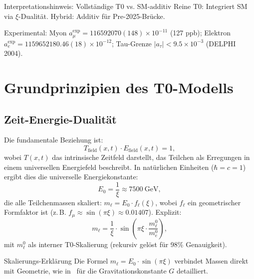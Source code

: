 \documentclass[12pt,a4paper]{article}
\theoremstyle{definition}
\begin{document}
	\begin{interpretation}{Interpretationshinweis: Vollständige T0 vs. SM-additiv}
		Reine T0: Integriert SM via $\xi$-Dualität. Hybrid: Additiv für Pre-2025-Brücke.
	\end{interpretation}
	
	Experimental: Myon $a_\mu^\text{exp} = 116592070(148) \times 10^{-11}$ (127 ppb); Elektron $a_e^\text{exp} = 1159652180.46(18) \times 10^{-12}$; Tau-Grenze $|a_\tau| < 9.5 \times 10^{-3}$ (DELPHI 2004).
	
	\section{Grundprinzipien des T0-Modells}
	\subsection{Zeit-Energie-Dualität}
	Die fundamentale Beziehung ist:
	\begin{equation}
		T_{\text{field}}(x,t) \cdot E_{\text{field}}(x,t) = 1,
	\end{equation}
	wobei $T(x,t)$ das intrinsische Zeitfeld darstellt, das Teilchen als Erregungen in einem universellen Energiefeld beschreibt. In natürlichen Einheiten ($\hbar = c = 1$) ergibt dies die universelle Energiekonstante:
	\begin{equation}
		E_0 = \frac{1}{\xi} \approx \SI{7500}{\giga\electronvolt},
	\end{equation}
	die alle Teilchenmassen skaliert: $m_\ell = E_0 \cdot f_\ell(\xi)$, wobei $f_\ell$ ein geometrischer Formfaktor ist (z.\,B. $f_\mu \approx \sin(\pi \xi) \approx 0.01407$). Explizit:
	\begin{equation}
		m_\ell = \frac{1}{\xi} \cdot \sin\left(\pi \xi \cdot \frac{m_\ell^0}{m_e^0}\right),
	\end{equation}
	mit $m_\ell^0$ als interner T0-Skalierung (rekursiv gelöst für 98\% Genauigkeit).
	
	\begin{explanation}{Skalierungs-Erklärung}
		Die Formel $m_\ell = E_0 \cdot \sin(\pi \xi)$ verbindet Massen direkt mit Geometrie, wie in~\cite{T0_gravitational_constant} für die Gravitationskonstante $G$ detailliert.
	\end{explanation}
	
\end{document}
